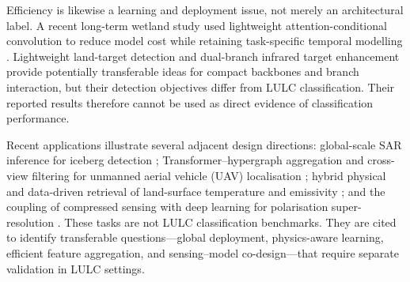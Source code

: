 \documentclass[]{interact}
\theoremstyle{plain}%
\theoremstyle{definition}
\theoremstyle{remark}
\DeclareRobustCommand{\DIFadd}[1]{{\protect\color{DIFaddcolor}\uwave{#1}}}
\def\DIFadd#1{#1}%
\begin{document}
\DIFadd{Efficiency} \DIFadd{is} \DIFadd{likewise} \DIFadd{a} \DIFadd{learning} \DIFadd{and} \DIFadd{deployment} \DIFadd{issue}\DIFadd{,} \DIFadd{not} \DIFadd{merely} \DIFadd{an} \DIFadd{architectural} \DIFadd{label}\DIFadd{.} \DIFadd{A} \DIFadd{recent} \DIFadd{long-term} \DIFadd{wetland} \DIFadd{study} \DIFadd{used} \DIFadd{lightweight} \DIFadd{attention-conditional} \DIFadd{convolution} \DIFadd{to} \DIFadd{reduce} \DIFadd{model} \DIFadd{cost} \DIFadd{while} \DIFadd{retaining} \DIFadd{task-specific} \DIFadd{temporal} \DIFadd{modelling} {\color{blue}\citep{yin2026lacc}}\DIFadd{.} \DIFadd{Lightweight} \DIFadd{land-target} \DIFadd{detection} {\color{blue}\citep{wang2024cgbiyolo} }\DIFadd{and} \DIFadd{dual-branch} \DIFadd{infrared} \DIFadd{target} \DIFadd{enhancement} {\color{blue}\citep{wang2025dabfnet} }\DIFadd{provide} \DIFadd{potentially} \DIFadd{transferable} \DIFadd{ideas} \DIFadd{for} \DIFadd{compact} \DIFadd{backbones} \DIFadd{and} \DIFadd{branch} \DIFadd{interaction}\DIFadd{,} \DIFadd{but} \DIFadd{their} \DIFadd{detection} \DIFadd{objectives} \DIFadd{differ} \DIFadd{from} LULC \DIFadd{classification}\DIFadd{.} \DIFadd{Their} \DIFadd{reported} \DIFadd{results} \DIFadd{therefore} \DIFadd{cannot} \DIFadd{be} \DIFadd{used} \DIFadd{as} \DIFadd{direct} \DIFadd{evidence} \DIFadd{of} \DIFadd{classification} \DIFadd{performance}\DIFadd{.}

\DIFadd{Recent} \DIFadd{applications} \DIFadd{illustrate} \DIFadd{several} \DIFadd{adjacent} \DIFadd{design} \DIFadd{directions}\DIFadd{:} \DIFadd{global-scale} \DIFadd{SAR} \DIFadd{inference} \DIFadd{for} \DIFadd{iceberg} \DIFadd{detection} {\color{blue}\citep{xie2026iceberg}}\DIFadd{;} \DIFadd{Transformer--hypergraph} \DIFadd{aggregation} \DIFadd{and} \DIFadd{cross-view} \DIFadd{filtering} \DIFadd{for} \DIFadd{unmanned} \DIFadd{aerial} \DIFadd{vehicle} \DIFadd{(}\DIFadd{UAV}\DIFadd{)} \DIFadd{localisation} {\color{blue}\citep{huang2026htgl,su2026cpfl}}\DIFadd{;} \DIFadd{hybrid} \DIFadd{physical} \DIFadd{and} \DIFadd{data-driven} \DIFadd{retrieval} \DIFadd{of} \DIFadd{land-surface} \DIFadd{temperature} \DIFadd{and} \DIFadd{emissivity} {\color{blue}\citep{wang2024lst}}\DIFadd{;} \DIFadd{and} \DIFadd{the} \DIFadd{coupling} \DIFadd{of} \DIFadd{compressed} \DIFadd{sensing} \DIFadd{with} \DIFadd{deep} \DIFadd{learning} \DIFadd{for} \DIFadd{polarisation} \DIFadd{super-resolution} {\color{blue}\citep{wu2026polarization}}\DIFadd{.} \DIFadd{These} tasks \DIFadd{are} \DIFadd{not} \DIFadd{LULC} \DIFadd{classification} \DIFadd{benchmarks}. \DIFadd{They} \DIFadd{are} \DIFadd{cited} \DIFadd{to} \DIFadd{identify} \DIFadd{transferable} \DIFadd{questions---global} \DIFadd{deployment}\DIFadd{,} \DIFadd{physics-aware} \DIFadd{learning}\DIFadd{,} \DIFadd{efficient} \DIFadd{feature} \DIFadd{aggregation}\DIFadd{,} \DIFadd{and} \DIFadd{sensing--model} \DIFadd{co-design---that} \DIFadd{require} \DIFadd{separate} \DIFadd{validation} \DIFadd{in} \DIFadd{LULC} \DIFadd{settings}\DIFadd{.}
\end{document}
